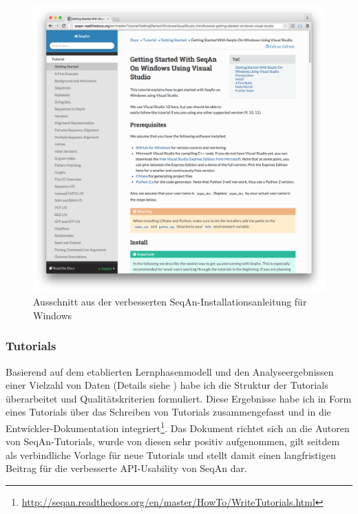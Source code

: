 \begin{figure}[ht!]
  \centering
    \includegraphics[width=1.0\linewidth]{Figures/getting-started-windows.png}
  \caption[SeqAn-Installation unter Windows]{Ausschnitt aus der verbesserten SeqAn-Installationsanleitung für Windows}
  \label{fig:getting-started-windows2}
\end{figure}



\subsubsection{Tutorials}

Basierend auf dem etablierten Lernphasenmodell \citep{Gagne:1985tx} und den Analyseergebnissen einer Vielzahl von Daten (Details siehe ) habe ich die Struktur der Tutorials überarbeitet und Qualitätskriterien formuliert. Diese Ergebnisse habe ich in Form eines Tutorials über das Schreiben von Tutorials zusammengefasst und in die Entwickler-Dokumentation integriert\footnote{\url{http://seqan.readthedocs.org/en/master/HowTo/WriteTutorials.html}}. Das Dokument richtet sich an die Autoren von SeqAn-Tutorials, wurde von diesen sehr positiv aufgenommen, gilt seitdem als verbindliche Vorlage für neue Tutorials und stellt damit einen langfristigen Beitrag für die verbesserte API-Usability von SeqAn dar.

